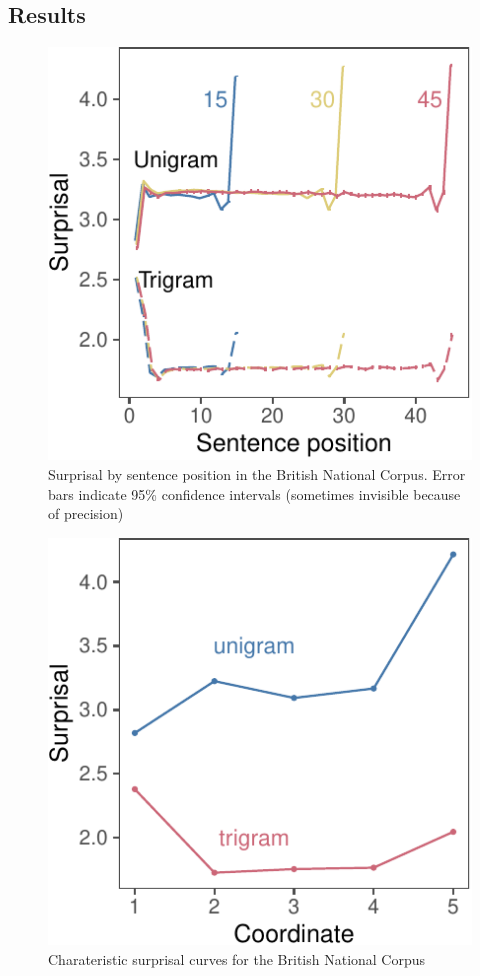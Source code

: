 \documentclass[10pt, letterpaper]{article}
\newenvironment{CodeChunk}{}{}
\begin{document}
\hypertarget{results}{%
\subsection{Results}\label{results}}

\begin{CodeChunk}
\begin{figure}[tb]
\includegraphics{figs/bnc_raw-1} \caption[Surprisal by sentence position in the British National Corpus]{Surprisal by sentence position in the British National Corpus. Error bars indicate 95\% confidence intervals (sometimes invisible because of precision)}\label{fig:bnc_raw}
\end{figure}
\end{CodeChunk}

\begin{CodeChunk}
\begin{figure}[tb]
\includegraphics{figs/bnc_barycenters-1} \caption[Charateristic surprisal curves for the British National Corpus]{Charateristic surprisal curves for the British National Corpus}\label{fig:bnc_barycenters}
\end{figure}
\end{CodeChunk}
\end{document}
